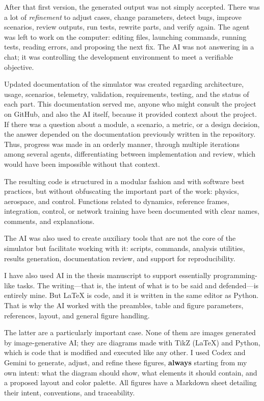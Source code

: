 After that first version, the generated output was not simply accepted. There was a lot of \textit{refinement} to adjust cases, change parameters, detect bugs, improve scenarios, review outputs, run tests, rewrite parts, and verify again. The agent was left to work on the computer: editing files, launching commands, running tests, reading errors, and proposing the next fix. The AI was not answering in a chat; it was controlling the development environment to meet a verifiable objective.

Updated documentation of the simulator was created regarding architecture, usage, scenarios, telemetry, validation, requirements, testing, and the status of each part. This documentation served me, anyone who might consult the project on GitHub, and also the AI itself, because it provided context about the project. If there was a question about a module, a scenario, a metric, or a design decision, the answer depended on the documentation previously written in the repository. Thus, progress was made in an orderly manner, through multiple iterations among several agents, differentiating between implementation and review, which would have been impossible without that context.

The resulting code is structured in a modular fashion and with software best practices, but without obfuscating the important part of the work: physics, aerospace, and control. Functions related to dynamics, reference frames, integration, control, or network training have been documented with clear names, comments, and explanations.

The AI was also used to create auxiliary tools that are not the core of the simulator but facilitate working with it: scripts, commands, analysis utilities, results generation, documentation review, and support for reproducibility.

I have also used AI in the thesis manuscript to support essentially programming-like tasks. The writing—that is, the intent of what is to be said and defended—is entirely mine. But LaTeX is code, and it is written in the same editor as Python. That is why the AI worked with the preambles, table and figure parameters, references, layout, and general figure handling.

The latter are a particularly important case. None of them are images generated by image-generative AI; they are diagrams made with TikZ (LaTeX) and Python, which is code that is modified and executed like any other. I used Codex and Gemini to generate, adjust, and refine these figures, \textbf{always} starting from my own intent: what the diagram should show, what elements it should contain, and a proposed layout and color palette. All figures have a Markdown sheet detailing their intent, conventions, and traceability.

